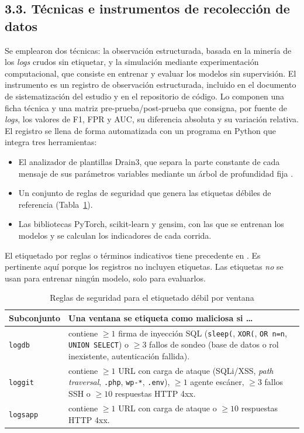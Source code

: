 \documentclass[jou,a4paper,floatsintext,donotrepeattitle]{apa7}
\begin{document}
\subsection{3.3. Técnicas e instrumentos de recolección de datos}
Se emplearon dos técnicas: la observación estructurada, basada en la minería de los \textit{logs} crudos sin etiquetar, y la simulación mediante experimentación computacional, que consiste en entrenar y evaluar los modelos sin supervisión. El instrumento es un registro de observación estructurada, incluido en el documento de sistematización del estudio y en el repositorio de código. Lo componen una ficha técnica y una matriz pre-prueba/post-prueba que consigna, por fuente de \textit{logs}, los valores de F1, FPR y AUC, su diferencia absoluta y su variación relativa. El registro se llena de forma automatizada con un programa en Python que integra tres herramientas:

\begin{itemize}
  \item El analizador de plantillas Drain3, que separa la parte constante de cada mensaje de sus parámetros variables mediante un árbol de profundidad fija \parencite{nasirzadeh2025,zhao2025}.
  \item Un conjunto de reglas de seguridad que genera las etiquetas débiles de referencia (Tabla~\ref{tab:reglas}).
  \item Las bibliotecas PyTorch, scikit-learn y gensim, con las que se entrenan los modelos y se calculan los indicadores de cada corrida.
\end{itemize}

El etiquetado por reglas o términos indicativos tiene precedente en \textcite{nasirzadeh2025}. Es pertinente aquí porque los registros no incluyen etiquetas. Las etiquetas \emph{no} se usan para entrenar ningún modelo, solo para evaluarlos.

\begin{table}[t]
\caption{Reglas de seguridad para el etiquetado débil por ventana}
\label{tab:reglas}
\small
\begin{tabularx}{\columnwidth}{@{}lX@{}}
\toprule
Subconjunto & Una ventana se etiqueta como maliciosa si \ldots \\
\midrule
\texttt{logdb} & contiene $\geq 1$ firma de inyección SQL (\texttt{sleep(}, \texttt{XOR(}, \texttt{OR n=n}, \texttt{UNION SELECT}) o $\geq 3$ fallos de sondeo (base de datos o rol inexistente, autenticación fallida). \\
\texttt{loggit} & contiene $\geq 1$ URL con carga de ataque (SQLi/XSS, \textit{path traversal}, \texttt{.php}, \texttt{wp-*}, \texttt{.env}), $\geq 1$ agente escáner, $\geq 3$ fallos SSH o $\geq 10$ respuestas HTTP 4xx. \\
\texttt{logsapp} & contiene $\geq 1$ URL con carga de ataque o $\geq 10$ respuestas HTTP 4xx. \\
\bottomrule
\end{tabularx}
\end{table}
\end{document}
